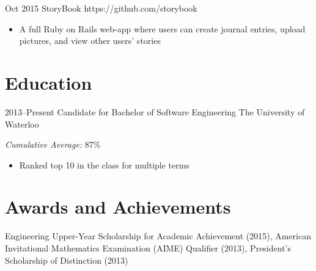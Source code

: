 \documentclass[print]{friggeri-cv} %
\begin{document}
\begin{projlist}
\proj
{Oct 2015}
{StoryBook}
{https://github.com/storybook}
{
\begin{itemize}
\item A full Ruby on Rails web-app where users can create journal entries, upload pictures, and view other users' stories
\end{itemize}}
\end{projlist}


\section{Education}

\begin{entrylist}
\entry
{2013--Present}
{{\normalfont Candidate for} Bachelor of Software Engineering}
{The University of Waterloo}
{\emph{Cumulative Average: }{87\%}
\begin{itemize}
\item Ranked top 10 in the class for multiple terms
\end{itemize}
}
\end{entrylist}


\section{Awards and Achievements}

Engineering Upper-Year Scholarship for Academic Achievement (2015), American Invitational Mathematics Examination (AIME) Qualifier (2013), President's Scholarship of Distinction (2013)
\end{document}
